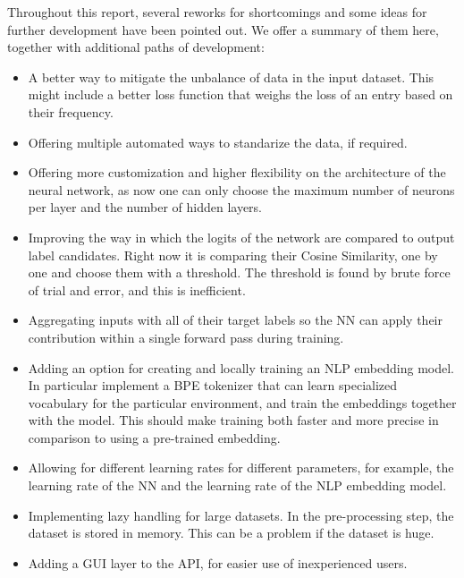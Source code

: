 \documentclass[a4paper, 11pt]{report}
\begin{document}
    Throughout this report, several reworks for shortcomings and some ideas for further development have been pointed out. We offer a summary of them here, together with additional paths of development:
    \begin{itemize}
        \item A better way to mitigate the unbalance of data in the input dataset. This might include a better loss function that weighs the loss of an entry based on their frequency.
        \item Offering multiple automated ways to standarize the data, if required.
        \item Offering more customization and higher flexibility on the architecture of the neural network, as now one can only choose the maximum number of neurons per layer and the number of hidden layers.
        \item Improving the way in which the logits of the network are compared to output label candidates. Right now it is comparing their Cosine Similarity, one by one and choose them with a threshold. The threshold is found by brute force of trial and error, and this is inefficient.
        \item Aggregating inputs with all of their target labels so the NN can apply their contribution within a single forward pass during training.
        \item Adding an option for creating and locally training an NLP embedding model. In particular implement a BPE tokenizer that can learn specialized vocabulary for the particular environment, and train the embeddings together with the model. This should make training both faster and more precise in comparison to using a pre-trained embedding.
        \item  Allowing for different learning rates for different parameters, for example, the learning rate of the NN and the learning rate of the NLP embedding model.
        \item Implementing lazy handling for large datasets. In the pre-processing step, the dataset is stored in memory. This can be a problem if the dataset is huge.
        \item Adding a GUI layer to the API, for easier use of inexperienced users.
    \end{itemize}
\end{document}
